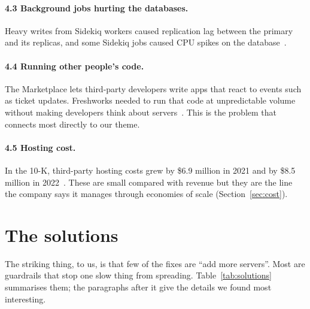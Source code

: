 \documentclass[10pt,a4paper]{article}
\begin{document}
\paragraph{4.3 Background jobs hurting the databases.} Heavy writes from Sidekiq workers caused replication lag between the primary and its replicas, and some Sidekiq jobs caused CPU spikes on the database~\cite{bgjobs}.

\paragraph{4.4 Running other people's code.} The Marketplace lets third-party developers write apps that react to events such as ticket updates. Freshworks needed to run that code at unpredictable volume without making developers think about servers~\cite{awslambda}. This is the problem that connects most directly to our theme.

\paragraph{4.5 Hosting cost.} In the 10-K, third-party hosting costs grew by \$6.9 million in 2021 and by \$8.5 million in 2022~\cite{tenk21,tenk22}. These are small compared with revenue but they are the line the company says it manages through economies of scale (Section~\ref{sec:cost}).

\section{The solutions}

The striking thing, to us, is that few of the fixes are ``add more servers''. Most are guardrails that stop one slow thing from spreading. Table~\ref{tab:solutions} summarises them; the paragraphs after it give the details we found most interesting.
\end{document}
